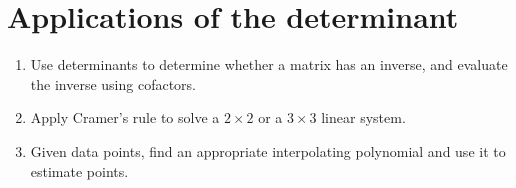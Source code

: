 \section{Applications of the determinant}

\begin{outcome}
  \begin{enumerate}
  \item Use determinants to determine whether a matrix has an inverse,
    and evaluate the inverse using cofactors.
  \item Apply Cramer's rule to solve a $2\times 2$ or a $3\times 3$
    linear system.
  \item Given data points, find an appropriate interpolating
    polynomial and use it to estimate points.
  \end{enumerate}
\end{outcome}
